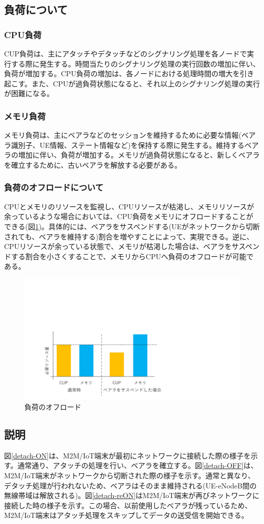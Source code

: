 \documentclass[a4j]{ujarticle}
\begin{document}
\subsection{負荷について}
\subsubsection{CPU負荷}
CUP負荷は、主にアタッチやデタッチなどのシグナリング処理を各ノードで実行する際に発生する。時間当たりのシグナリング処理の実行回数の増加に伴い、負荷が増加する。CPU負荷の増加は、各ノードにおける処理時間の増大を引き起こす。また、CPUが過負荷状態になると、それ以上のシグナリング処理の実行が困難になる。
\subsubsection{メモリ負荷}
メモリ負荷は、主にベアラなどのセッションを維持するために必要な情報(ベアラ識別子、UE情報、ステート情報など)を保持する際に発生する。維持するベアラの増加に伴い、負荷が増加する。メモリが過負荷状態になると、新しくベアラを確立するために、古いベアラを解放する必要がある。
\subsubsection{負荷のオフロードについて}
CPUとメモリのリソースを監視し、CPUリソースが枯渇し、メモリリソースが余っているような場合においては、CPU負荷をメモリにオフロードすることができる(図\ref{グラフ})。具体的には、ベアラをサスペンドする(UEがネットワークから切断されても、ベアラを維持する)割合を増やすことによって、実現できる。逆に、CPUリソースが余っている状態で、メモリが枯渇した場合は、ベアラをサスペンドする割合を小さくすることで、メモリからCPUへ負荷のオフロードが可能である。
\begin{figure}[htbp]
	\centering
	\includegraphics[width=0.7\hsize]{グラフ.pdf}
  \caption{負荷のオフロード}
	\label{グラフ}
\end{figure}
\subsection{説明}
図\ref{detach-ON}は、M2M/IoT端末が最初にネットワークに接続した際の様子を示す。通常通り、アタッチの処理を行い、ベアラを確立する。図\ref{detach-OFF}は、M2M/IoT端末がネットワークから切断された際の様子を示す。通常と異なり、デタッチ処理が行われないため、ベアラはそのまま維持される(UE-eNodeB間の無線帯域は解放される)。図\ref{detach-reON}はM2M/IoT端末が再びネットワークに接続した時の様子を示す。この場合、以前使用したベアラが残っているため、M2M/IoT端末はアタッチ処理をスキップしてデータの送受信を開始できる。
\end{document}
